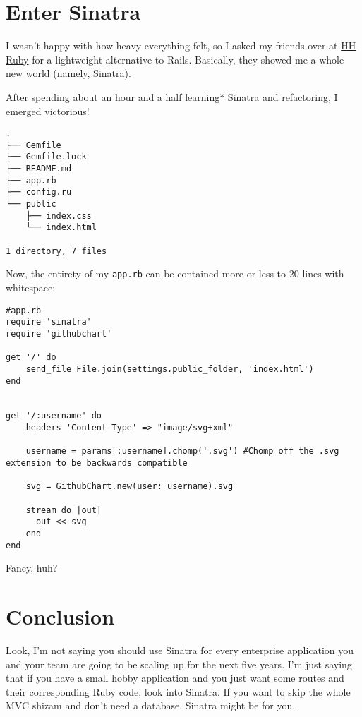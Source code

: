 \documentclass[12pt]{article}
\begin{document}
\section{Enter Sinatra}\label{enter-sinatra}

I wasn't happy with how heavy everything felt, so I asked my friends
over at \href{https://www.facebook.com/groups/HHRuby/}{HH Ruby} for a
lightweight alternative to Rails. Basically, they showed me a whole new
world (namely, \href{http://www.sinatrarb.com/}{Sinatra}).


After spending about an hour and a half learning* Sinatra and
refactoring, I emerged victorious!

\begin{verbatim}
.
├── Gemfile
├── Gemfile.lock
├── README.md
├── app.rb
├── config.ru
└── public
    ├── index.css
    └── index.html

1 directory, 7 files
\end{verbatim}

Now, the entirety of my \texttt{app.rb} can be contained more or less to
20 lines with whitespace:

\begin{verbatim}
#app.rb
require 'sinatra'
require 'githubchart'

get '/' do
    send_file File.join(settings.public_folder, 'index.html')
end


get '/:username' do
    headers 'Content-Type' => "image/svg+xml"

    username = params[:username].chomp('.svg') #Chomp off the .svg extension to be backwards compatible

    svg = GithubChart.new(user: username).svg

    stream do |out|
      out << svg
    end
end
\end{verbatim}

Fancy, huh?

\section{Conclusion}\label{conclusion}

Look, I'm not saying you should use Sinatra for every enterprise
application you and your team are going to be scaling up for the next
five years. I'm just saying that if you have a small hobby application
and you just want some routes and their corresponding Ruby code, look
into Sinatra. If you want to skip the whole MVC shizam and don't need a
database, Sinatra might be for you.
\end{document}
